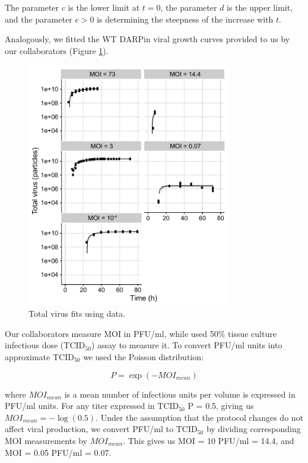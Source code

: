 The parameter $c$ is the lower limit at $t=0$, the parameter $d$ is the upper limit, and the parameter $e>0$ is determining the steepness of the increase with $t$.

Analogously, we fitted the WT DARPin viral growth curves provided to us by our collaborators \cite{DarpinData} (Figure \ref{figure:totalVirusFits}).

\begin{figure}
\begin{center}
\includegraphics[width=0.8\textwidth, trim={0cm 0cm 0cm 0cm}, clip]{D_chapters/3_DARPinModels/fittingTotalVirus.pdf}
\caption[Total virus fits]{Total virus fits using \cite{rudiger2019multiscale, DarpinData} data.}
\label{figure:totalVirusFits}
\end{center}
\end{figure}

Our collaborators measure MOI in PFU/ml, while \cite{rudiger2019multiscale} used 50\% tissue culture infectious dose (TCID$_{50}$) assay to measure it. To convert PFU/ml units into approximate TCID$_{50}$ we used the Poisson distribution:

\begin{equation}
P = \exp(-MOI_{mean})
\end{equation}

where $MOI_{mean}$ is a mean number of infectious units per volume is expressed in PFU/ml units. For any titer expressed in TCID$_{50}$ P = 0.5, giving us $MOI_{mean} = -\log(0.5)$. Under the assumption that the protocol changes do not affect viral production, we convert PFU/ml to TCID$_{50}$ by dividing corresponding MOI measurements by $MOI_{mean}$. This gives us MOI = 10 PFU/ml = 14.4, and MOI = 0.05 PFU/ml = 0.07.

